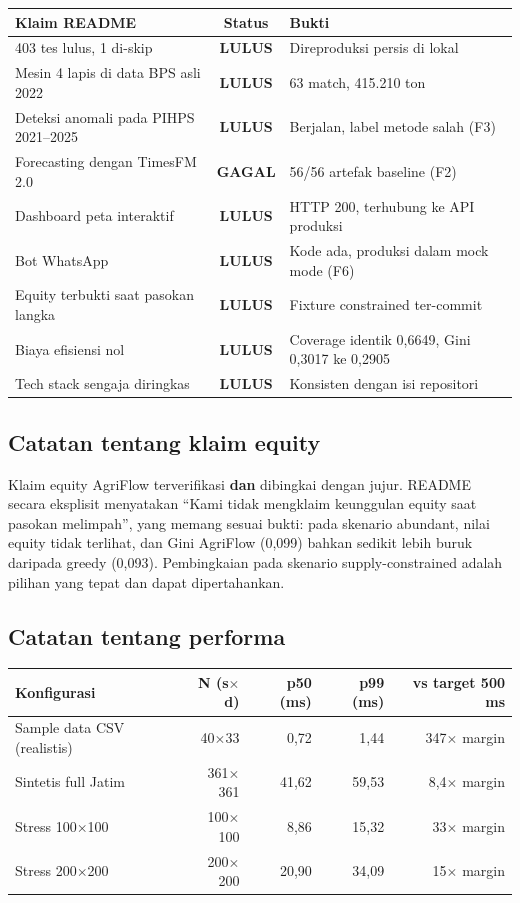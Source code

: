 \documentclass[11pt,a4paper]{article}
\newcommand{\ok}{\textcolor{okgreen}{\textbf{LULUS}}}
\newcommand{\gagal}{\textcolor{sevhigh}{\textbf{GAGAL}}}
\begin{document}
\begin{center}
\begin{tabular}{@{}p{5.6cm}cp{7.8cm}@{}}
\toprule
\textbf{Klaim README} & \textbf{Status} & \textbf{Bukti} \\
\midrule
403 tes lulus, 1 di-skip & \ok & Direproduksi persis di lokal \\
Mesin 4 lapis di data BPS asli 2022 & \ok & 63 match, 415.210 ton \\
Deteksi anomali pada PIHPS 2021--2025 & \ok & Berjalan, label metode salah (F3) \\
Forecasting dengan TimesFM 2.0 & \gagal & 56/56 artefak baseline (F2) \\
Dashboard peta interaktif & \ok & HTTP 200, terhubung ke API produksi \\
Bot WhatsApp & \ok & Kode ada, produksi dalam mock mode (F6) \\
Equity terbukti saat pasokan langka & \ok & Fixture constrained ter-commit \\
Biaya efisiensi nol & \ok & Coverage identik 0,6649, Gini 0,3017 ke 0,2905 \\
Tech stack sengaja diringkas & \ok & Konsisten dengan isi repositori \\
\bottomrule
\end{tabular}
\end{center}

\subsection{Catatan tentang klaim equity}

Klaim equity AgriFlow terverifikasi \textbf{dan} dibingkai dengan jujur. README secara eksplisit
menyatakan ``Kami tidak mengklaim keunggulan equity saat pasokan melimpah'', yang memang sesuai
bukti: pada skenario abundant, nilai equity tidak terlihat, dan Gini AgriFlow (0,099) bahkan
sedikit lebih buruk daripada greedy (0,093). Pembingkaian pada skenario supply-constrained adalah
pilihan yang tepat dan dapat dipertahankan.

\subsection{Catatan tentang performa}

\begin{center}
\begin{tabular}{@{}lrrrr@{}}
\toprule
\textbf{Konfigurasi} & \textbf{N (s$\times$d)} & \textbf{p50 (ms)} & \textbf{p99 (ms)} & \textbf{vs target 500 ms} \\
\midrule
Sample data CSV (realistis) & 40$\times$33   & 0,72  & 1,44  & 347$\times$ margin \\
Sintetis full Jatim         & 361$\times$361 & 41,62 & 59,53 & 8,4$\times$ margin \\
Stress 100$\times$100       & 100$\times$100 & 8,86  & 15,32 & 33$\times$ margin \\
Stress 200$\times$200       & 200$\times$200 & 20,90 & 34,09 & 15$\times$ margin \\
\bottomrule
\end{tabular}
\end{center}
\end{document}
